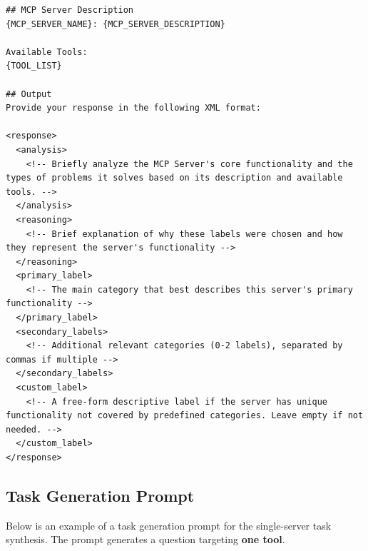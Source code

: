 \begin{verbatim}
## MCP Server Description
{MCP_SERVER_NAME}: {MCP_SERVER_DESCRIPTION}

Available Tools:
{TOOL_LIST}

## Output
Provide your response in the following XML format:

<response>
  <analysis>
    <!-- Briefly analyze the MCP Server's core functionality and the types of problems it solves based on its description and available tools. -->
  </analysis>
  <reasoning>
    <!-- Brief explanation of why these labels were chosen and how they represent the server's functionality -->
  </reasoning>
  <primary_label>
    <!-- The main category that best describes this server's primary functionality -->
  </primary_label>
  <secondary_labels>
    <!-- Additional relevant categories (0-2 labels), separated by commas if multiple -->
  </secondary_labels>
  <custom_label>
    <!-- A free-form descriptive label if the server has unique functionality not covered by predefined categories. Leave empty if not needed. -->
  </custom_label>
</response>
\end{verbatim}

\subsection{Task Generation Prompt}
\label{app:task-generation-prompt-for-single-server}

Below is an example of a task generation prompt for the single-server task synthesis. The prompt generates a question targeting \textbf{one tool}.


